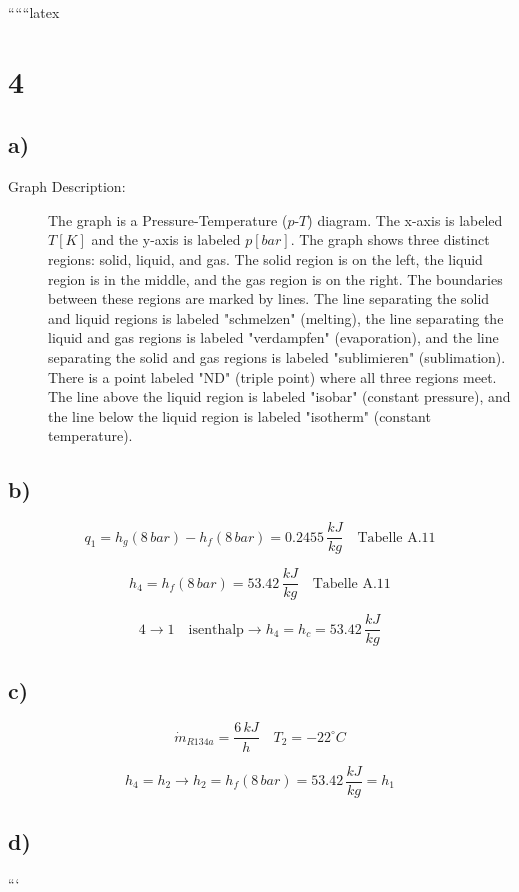 
``````latex


\section*{4}

\subsection*{a)}

\begin{description}
    \item[Graph Description:] The graph is a Pressure-Temperature ($p$-$T$) diagram. The x-axis is labeled $T [K]$ and the y-axis is labeled $p [bar]$. The graph shows three distinct regions: solid, liquid, and gas. The solid region is on the left, the liquid region is in the middle, and the gas region is on the right. The boundaries between these regions are marked by lines. The line separating the solid and liquid regions is labeled "schmelzen" (melting), the line separating the liquid and gas regions is labeled "verdampfen" (evaporation), and the line separating the solid and gas regions is labeled "sublimieren" (sublimation). There is a point labeled "ND" (triple point) where all three regions meet. The line above the liquid region is labeled "isobar" (constant pressure), and the line below the liquid region is labeled "isotherm" (constant temperature).
\end{description}

\subsection*{b)}

\[
q_1 = h_{g}(8 \, bar) - h_f(8 \, bar) = 0.2455 \, \frac{kJ}{kg} \quad \text{Tabelle A.11}
\]

\[
h_4 = h_f(8 \, bar) = 53.42 \, \frac{kJ}{kg} \quad \text{Tabelle A.11}
\]

\[
4 \rightarrow 1 \quad \text{isenthalp} \rightarrow h_4 = h_c = 53.42 \, \frac{kJ}{kg}
\]

\subsection*{c)}

\[
\dot{m}_{R134a} = \frac{6 \, kJ}{h} \quad T_2 = -22^\circ C
\]

\[
h_4 = h_2 \rightarrow h_2 = h_f(8 \, bar) = 53.42 \, \frac{kJ}{kg} = h_1
\]

\subsection*{d)}

```